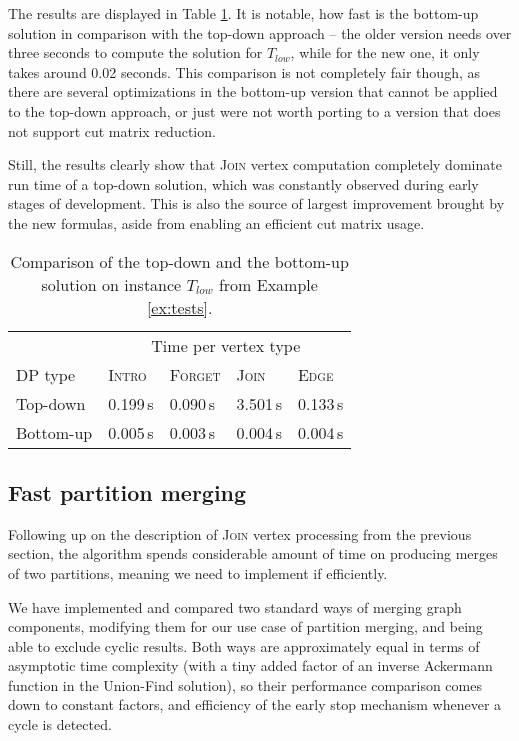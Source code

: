 \documentclass[thesis=M,english,hidelinks]{FITthesis}[2012/10/20]
\theoremstyle{definition}
\begin{document}
The results are displayed in Table \ref{tab:vertcomp}. It is notable, how fast is the bottom-up solution in comparison
with the top-down approach -- the older version needs over three seconds to compute the solution for $T_{low}$, while
for the new one, it only takes around 0.02 seconds. This comparison is not completely fair though, as there are several
optimizations in the bottom-up version that cannot be applied to the top-down approach, or just were not worth porting
to a version that does not support cut matrix reduction.

Still, the results clearly show that \textsc{Join} vertex computation completely dominate run time of a top-down
solution, which was constantly observed during early stages of development. This is also the source of largest
improvement brought by the new formulas, aside from enabling an efficient cut matrix usage.

\begin{table}[ht]

    \centering
    \begin{tabular}{ m{3cm} | m{1.5cm} m{1.5cm} m{1.5cm} m{1.5cm} }
        & \multicolumn{4}{c}{Time per vertex type} \\
        DP type & \textsc{Intro} & \textsc{Forget} & \textsc{Join} & \textsc{Edge} \\
        \midrule
        Top-down & 0.199\,s & 0.090\,s & 3.501\,s & 0.133\,s \\
        Bottom-up & 0.005\,s & 0.003\,s & 0.004\,s & 0.004\,s \\
    \end{tabular}

    \caption{Comparison of the top-down and the bottom-up solution on instance $T_{low}$ from Example \ref{ex:tests}.}
    \label{tab:vertcomp}
\end{table}

\subsection{Fast partition merging}
\label{sec:partmerge}

Following up on the description of \textsc{Join} vertex processing from the previous section, the algorithm spends
considerable amount of time on producing merges of two partitions, meaning we need to implement if efficiently.

We have implemented and compared two standard ways of merging graph components, modifying them for our use case of
partition merging, and being able to exclude cyclic results. Both ways are approximately equal in terms of asymptotic
time complexity (with a tiny added factor of an inverse Ackermann function in the Union-Find solution), so their
performance comparison comes down to constant factors, and efficiency of the early stop mechanism whenever a cycle is
detected.
\end{document}
